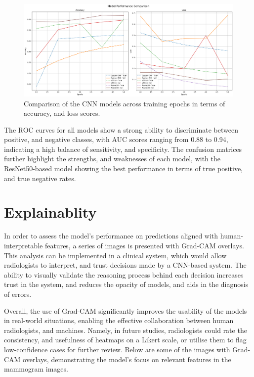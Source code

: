 \documentclass[../main]{subfiles}
\begin{document}
\begin{figure}[h!]
    \centering
    \includegraphics[width=1\textwidth]{assets/comparison.png}
    \caption{Comparison of the CNN models across training epochs in terms of accuracy, and loss scores.}
    \label{fig:comparison-models}
\end{figure}

\noindent The ROC curves for all models show a strong ability to discriminate between positive, and negative classes, with AUC scores ranging from 0.88 to 0.94, indicating a high balance of sensitivity, and specificity. The confusion matrices further highlight the strengths, and weaknesses of each model, with the ResNet50-based model showing the best performance in terms of true positive, and true negative rates.

\section{Explainablity}
\label{sec:explainability}
In order to assess the model's performance on predictions aligned with human-interpretable features, a series of images is presented with Grad-CAM overlays. This analysis can be implemented in a clinical system, which would allow radiologists to interpret, and trust decisions made by a CNN-based system. The ability to visually validate the reasoning process behind each decision increases trust in the system, and reduces the opacity of models, and aids in the diagnosis of errors.

Overall, the use of Grad-CAM significantly improves the usability of the models in real-world situations, enabling the effective collaboration between human radiologists, and machines. Namely, in future studies, radiologists could rate the consistency, and usefulness of heatmaps on a Likert scale, or utilise them to flag low-confidence cases for further review. Below are some of the images with Grad-CAM overlays, demonstrating the model's focus on relevant features in the mammogram images.
\end{document}
